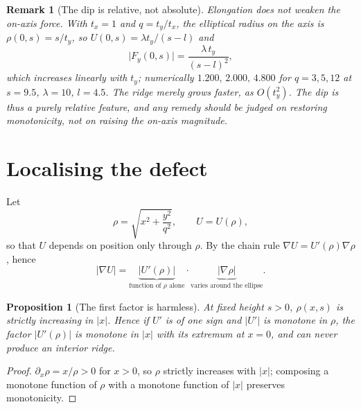 \documentclass[11pt]{article}
\newtheorem{proposition}[theorem]{Proposition}
\newtheorem{remark}[theorem]{Remark}
\begin{document}
\begin{remark}[The dip is relative, not absolute]
\label{rem:relative}
Elongation does not weaken the on-axis force. With $t_{x}=1$ and
$q=t_{y}/t_{x}$, the elliptical radius on the axis is $\rho(0,s)=s/t_{y}$, so
$U(0,s)=\lambda t_{y}/(s-l)$ and
\begin{equation}
  \bigl|F_{y}(0,s)\bigr|=\frac{\lambda\,t_{y}}{(s-l)^{2}},
  \label{eq:onaxis}
\end{equation}
which \emph{increases} linearly with $t_{y}$; numerically
$1.200,\,2.000,\,4.800$ for $q=3,5,12$ at $s=9.5$, $\lambda=10$, $l=4.5$.
The ridge merely grows faster, as $O(t_{y}^{2})$. The dip is thus a purely
relative feature, and any remedy should be judged on restoring monotonicity,
not on raising the on-axis magnitude.
\end{remark}

\section{Localising the defect}

Let
\begin{equation}
  \rho=\sqrt{x^{2}+\frac{y^{2}}{q^{2}}},\qquad U=U(\rho),
\end{equation}
so that $U$ depends on position only through $\rho$. By the chain rule
$\nabla U=U'(\rho)\nabla\rho$, hence
\begin{equation}
  \bigl|\nabla U\bigr|
  =\underbrace{\bigl|U'(\rho)\bigr|}_{\text{function of }\rho\text{ alone}}
  \cdot
  \underbrace{\bigl|\nabla\rho\bigr|}_{\text{varies around the ellipse}} .
  \label{eq:factorisation}
\end{equation}

\begin{proposition}[The first factor is harmless]
\label{prop:harmless}
At fixed height $s>0$, $\rho(x,s)$ is strictly increasing in $|x|$. Hence if
$U'$ is of one sign and $|U'|$ is monotone in $\rho$, the factor $|U'(\rho)|$
is monotone in $|x|$ with its extremum at $x=0$, and can never produce an
interior ridge.
\end{proposition}

\begin{proof}
$\partial_{x}\rho=x/\rho>0$ for $x>0$, so $\rho$ strictly increases with
$|x|$; composing a monotone function of $\rho$ with a monotone function of
$|x|$ preserves monotonicity.
\end{proof}
\end{document}
